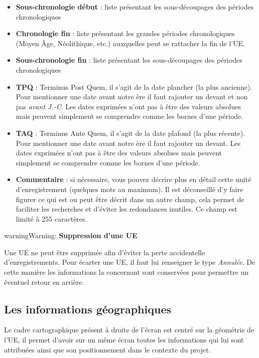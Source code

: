 \documentclass[letterpaper,10pt,french]{sphinxmanual}
\begin{document}
\begin{itemize}
\item {} 
\textbf{Sous-chronologie début} : liste présentant les sous-découpages des périodes chronologiques

\item {} 
\textbf{Chronologie fin} : liste présentant les grandes périodes chronologiques (Moyen Âge, Néolithique, etc.) auxquelles peut se rattacher la fin de l'UE.

\item {} 
\textbf{Sous-chronologie fin} : liste présentant les sous-découpages des périodes chronologiques

\item {} 
\textbf{TPQ} : Terminus Post Quem, il s'agit de la date plancher (la plus ancienne). Pour mentionner une date avant notre ère il faut rajouter un \code{-} devant et non pas \emph{avant J.-C}. Les dates exprimées n'ont pas à être des valeurs absolues mais peuvent simplement se comprendre comme les bornes d'une période.

\item {} 
\textbf{TAQ} : Terminus Ante Quem, il s'agit de la date plafond (la plus récente). Pour mentionner une date avant notre ère il faut rajouter un \code{-} devant. Les dates exprimées n'ont pas à être des valeurs absolues mais peuvent simplement se comprendre comme les bornes d'une période.

\item {} 
\textbf{Commentaire} : si nécessaire, vous pouvez décrire plus en détail cette unité d'enregistrement (quelques mots au maximum). Il est déconseillé d'y faire figurer ce qui est ou peut être décrit dans un autre champ, cela permet de faciliter les recherches et d'éviter les redondances inutiles. Ce champ est limité à 255 caractères.

\end{itemize}

\begin{notice}{warning}{Warning:}
\textbf{Suppression d'une UE}

Une UE ne peut être supprimée afin d'éviter la perte accidentelle d'enregistrements. Pour écarter une UE, il faut lui renseigner le type \emph{Annulée}. De cette manière les informations la concernant sont conservées pour permettre un éventuel retour en arrière.
\end{notice}


\subsection{Les informations géographiques}
\label{manuel/formulaire_ue:les-informations-geographiques}
Le cadre cartographique présent à droite de l'écran est centré sur la géométrie de l'UE, il permet d'avoir sur un même écran toutes les informations qui lui sont attribuées ainsi que son positionnement dans le contexte du projet.
\end{document}
